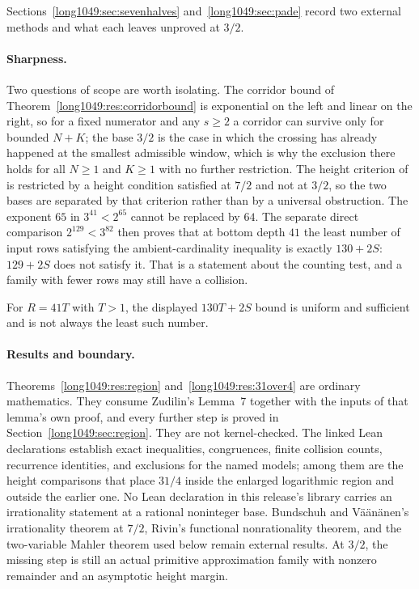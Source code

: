 Sections~\ref{long1049:sec:sevenhalves} and~\ref{long1049:sec:pade} record two external methods
and what each leaves unproved at $3/2$.

\paragraph{Sharpness.}
Two questions of scope are worth isolating.  The corridor bound of
Theorem~\ref{long1049:res:corridorbound} is exponential on the left and linear on the
right, so for a fixed numerator and any $s\ge2$ a corridor can survive only for
bounded $N+K$; the base $3/2$ is the case in which the crossing has already
happened at the smallest admissible window, which is why the exclusion there
holds for all $N\ge1$ and $K\ge1$ with no further restriction.  The height
criterion of~\cite{bv1994} is restricted by a height condition satisfied at
$7/2$ and not at $3/2$, so the two bases are separated by that criterion rather
than by a universal obstruction.  The exponent $65$ in
$3^{41}<2^{65}$ cannot be replaced by $64$.  The separate direct comparison
$2^{129}<3^{82}$ then proves that at bottom depth $41$ the least number of input
rows satisfying the ambient-cardinality inequality is exactly $130+2S$:
$129+2S$ does not satisfy it.  That is a statement about the counting test, and
a family with fewer rows may still have a collision.

For $R=41T$ with $T>1$, the displayed $130T+2S$ bound is uniform and sufficient
and is not always the least such number.

\statusboundary

\paragraph{Results and boundary.}
Theorems~\ref{long1049:res:region} and~\ref{long1049:res:31over4} are ordinary mathematics.  They
consume Zudilin's Lemma~7 together with the inputs of that lemma's own proof,
and every further step is proved in Section~\ref{long1049:sec:region}.  They are not
kernel-checked.  The linked Lean declarations establish exact inequalities,
congruences, finite collision counts, recurrence identities, and exclusions for
the named models; among them are the height comparisons that place \(31/4\)
inside the enlarged logarithmic region and outside the earlier one.  No Lean
declaration in this release's library carries an irrationality statement at a
rational noninteger base.  Bundschuh and V\"a\"an\"anen's irrationality theorem
at \(7/2\), Rivin's functional nonrationality theorem, and the two-variable
Mahler theorem used below remain external results.  At \(3/2\), the missing
step is still an actual primitive approximation family with nonzero remainder
and an asymptotic height margin.

